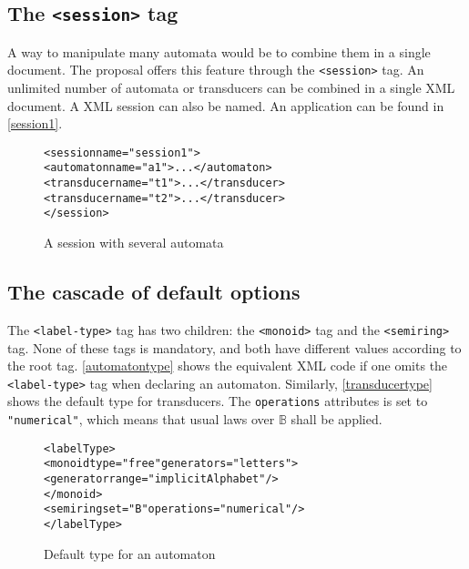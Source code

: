 \documentclass[a4paper]{article}
\newcommand{\xtag}[1]{\texttt{<#1>}}
\newcommand{\xattr}[1]{\texttt{#1}}
\def\typetag{\xtag{label-type}}
\def\sessiontag{\xtag{session}}
\def\monoidtag{\xtag{monoid}}
\def\semiringtag{\xtag{semiring}}
\begin{document}
\subsection{The \sessiontag{} tag}

A way to manipulate many automata would be to combine them in a single
document. The proposal offers this feature through the \sessiontag{}
tag. An unlimited number of automata or transducers can be combined in
a single XML document. A XML session can also be named.  An
application can be found in \autoref{session1}.

\begin{figure}[ht]
  \small
  \begin{center}
\begin{alltt}
<session name="session1">
  <automaton name="a1">...</automaton>
  <transducer name="t1">...</transducer>
  <transducer name="t2">...</transducer>
</session>
\end{alltt}

\caption{A session with several automata}
\label{session1}
  \end{center}
\end{figure}

\subsection{The cascade of default options}

The \typetag{} tag has two children: the \monoidtag{} tag and the
\semiringtag{} tag. None of these tags is mandatory, and both have
different values according to the root tag. \autoref{automatontype}
shows the equivalent XML code if one omits the \typetag{} tag when
declaring an automaton. Similarly, \autoref{transducertype} shows the
default type for transducers.  The \xattr{operations} attributes is
set to \verb|"numerical"|, which means that usual laws over
$\mathbb{B}$ shall be applied.

\begin{figure}[ht]
  \begin{center}
\begin{alltt}
<labelType>
  <monoid type="free" generators="letters">
     <generator range="implicitAlphabet"/>
  </monoid>
  <semiring set="B" operations="numerical"/>
</labelType>
\end{alltt}

\caption{Default type for an automaton}
\label{automatontype}
  \end{center}
\end{figure}
\end{document}
